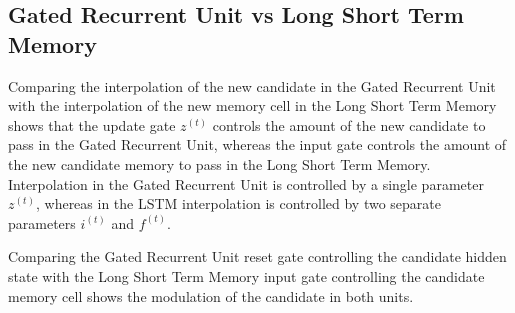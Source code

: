 \subsection{Gated Recurrent Unit vs Long Short Term Memory}

\noindent Comparing the interpolation of the new candidate in the Gated Recurrent Unit with the interpolation of the new memory cell in the Long Short Term Memory shows that the update gate $z^{(t)}$ controls the amount of the new candidate to pass in the Gated Recurrent Unit, whereas the input gate controls the amount of the new candidate memory to pass in the Long Short Term Memory. Interpolation in the Gated Recurrent Unit is controlled by a single parameter $z^{(t)}$, whereas in the LSTM interpolation is controlled by two separate parameters $i^{(t)}$ and $f^{(t)}$.

\begin{figure}[h]
\centering     %
{}
\label{fig:lstm-gru-interpolation}
\end{figure}

\newpage
\noindent Comparing the Gated Recurrent Unit reset gate controlling the candidate hidden state with the Long Short Term Memory input gate controlling the candidate memory cell shows the modulation of the candidate in both units.


